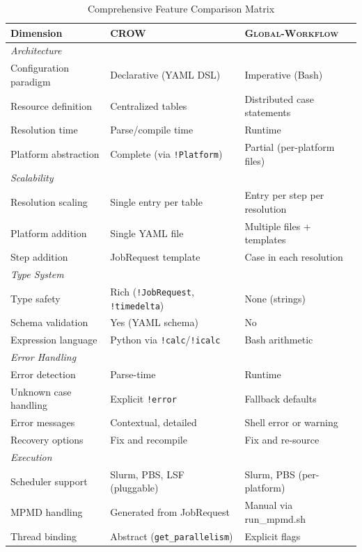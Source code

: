\documentclass[11pt,twoside]{article}
\newcommand{\crow}{\textsc{CROW}}
\newcommand{\gw}{\textsc{Global-Workflow}}
\begin{document}
\begin{table}[t]
\centering
\caption{Comprehensive Feature Comparison Matrix}
\label{tab:summary}
\begin{tabular}{@{}p{4.5cm}p{5.5cm}p{5.5cm}@{}}
\toprule
\textbf{Dimension} & \textbf{\crow{}} & \textbf{\gw{}} \\
\midrule
\multicolumn{3}{l}{\textit{Architecture}} \\
Configuration paradigm & Declarative (YAML DSL) & Imperative (Bash) \\
Resource definition & Centralized tables & Distributed case statements \\
Resolution time & Parse/compile time & Runtime \\
Platform abstraction & Complete (via \texttt{!Platform}) & Partial (per-platform files) \\
\midrule
\multicolumn{3}{l}{\textit{Scalability}} \\
Resolution scaling & Single entry per table & Entry per step per resolution \\
Platform addition & Single YAML file & Multiple files + templates \\
Step addition & JobRequest template & Case in each resolution \\
\midrule
\multicolumn{3}{l}{\textit{Type System}} \\
Type safety & Rich (\texttt{!JobRequest}, \texttt{!timedelta}) & None (strings) \\
Schema validation & Yes (YAML schema) & No \\
Expression language & Python via \texttt{!calc}/\texttt{!icalc} & Bash arithmetic \\
\midrule
\multicolumn{3}{l}{\textit{Error Handling}} \\
Error detection & Parse-time & Runtime \\
Unknown case handling & Explicit \texttt{!error} & Fallback defaults \\
Error messages & Contextual, detailed & Shell error or warning \\
Recovery options & Fix and recompile & Fix and re-source \\
\midrule
\multicolumn{3}{l}{\textit{Execution}} \\
Scheduler support & Slurm, PBS, LSF (pluggable) & Slurm, PBS (per-platform) \\
MPMD handling & Generated from JobRequest & Manual via run\_mpmd.sh \\
Thread binding & Abstract (\texttt{get\_parallelism}) & Explicit flags \\

\end{tabular}
\end{table}
\end{document}
